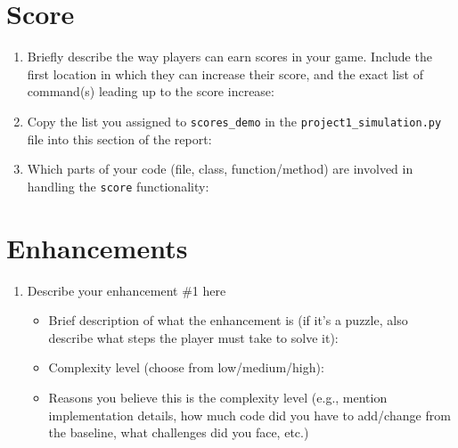 \documentclass[11pt]{article}
\begin{document}
\section*{Score}
\begin{enumerate}

    \item Briefly describe the way players can earn scores in your game. Include the first location in which they can increase their score, and the exact list of command(s) leading up to the score increase:


    \item Copy the list you assigned to \texttt{scores\_demo} in the \texttt{project1\_simulation.py} file into this section of the report:


    \item Which parts of your code (file, class, function/method) are involved in handling the \texttt{score} functionality:
\end{enumerate}

\section*{Enhancements}
\begin{enumerate}
    \item Describe your enhancement \#1 here
    \begin{itemize}
        \item Brief description of what the enhancement is (if it's a puzzle, also describe what steps the player must take to solve it):
        \item Complexity level (choose from low/medium/high):
        \item Reasons you believe this is the complexity level (e.g., mention implementation details, how much code did you have to add/change from the baseline, what challenges did you face, etc.)
    \end{itemize}

\end{enumerate}
\end{document}
